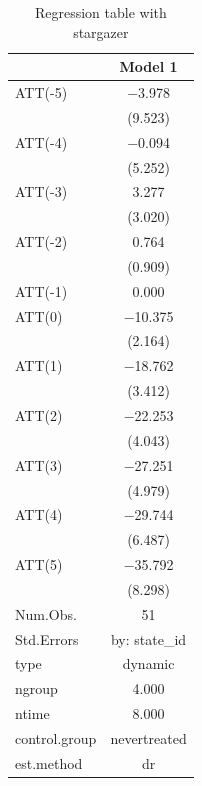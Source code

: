 \documentclass[
]{article}
\begin{document}
\begin{table}

\caption{\label{tab:table-4}Regression table with stargazer}
\centering
\begin{tabular}[t]{lc}
\toprule
  & Model 1\\
\midrule
ATT(-5) & \num{-3.978}\\
 & (\num{9.523})\\
ATT(-4) & \num{-0.094}\\
 & (\num{5.252})\\
ATT(-3) & \num{3.277}\\
 & (\num{3.020})\\
ATT(-2) & \num{0.764}\\
 & (\num{0.909})\\
ATT(-1) & \num{0.000}\\
ATT(0) & \num{-10.375}\\
 & (\num{2.164})\\
ATT(1) & \num{-18.762}\\
 & (\num{3.412})\\
ATT(2) & \num{-22.253}\\
 & (\num{4.043})\\
ATT(3) & \num{-27.251}\\
 & (\num{4.979})\\
ATT(4) & \num{-29.744}\\
 & (\num{6.487})\\
ATT(5) & \num{-35.792}\\
 & (\num{8.298})\\
\midrule
Num.Obs. & \num{51}\\
Std.Errors & by: state\_id\\
type & dynamic\\
ngroup & \num{4.000}\\
ntime & \num{8.000}\\
control.group & nevertreated\\
est.method & dr\\
\bottomrule
\end{tabular}
\end{table}
\end{document}

